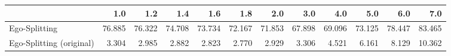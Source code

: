 \begin{tabular}{lrrrrrrrrrrr}
\toprule
{} &    1.0 &    1.2 &    1.4 &    1.6 &    1.8 &    2.0 &    3.0 &    4.0 &    5.0 &    6.0 &    7.0 \\
\midrule
Ego-Splitting            & 76.885 & 76.322 & 74.708 & 73.734 & 72.167 & 71.853 & 67.898 & 69.096 & 73.125 & 78.447 & 83.465 \\
Ego-Splitting (original) &  3.304 &  2.985 &  2.882 &  2.823 &  2.770 &  2.929 &  3.306 &  4.521 &  6.161 &  8.129 & 10.362 \\
\bottomrule
\end{tabular}
